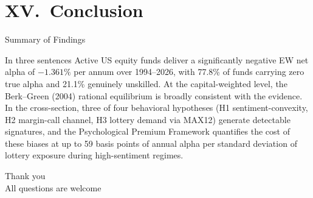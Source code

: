 \documentclass[10pt, aspectratio=169]{beamer}
\newcommand{\pct}{\%}
\begin{document}
\section{XV.\ Conclusion}

\begin{frame}{Summary of Findings}
  \begin{block}{In three sentences}
    Active US equity funds deliver a significantly negative EW net alpha of
    $-1.361\pct$ per annum over 1994–2026, with 77.8\% of funds carrying zero true alpha
    and 21.1\% genuinely unskilled. At the capital-weighted level, the Berk–Green (2004)
    rational equilibrium is broadly consistent with the evidence. In the cross-section,
    three of four behavioral hypotheses (H1 sentiment-convexity, H2 margin-call channel,
    H3 lottery demand via MAX12) generate detectable signatures, and the Psychological
    Premium Framework quantifies the cost of these biases at up to 59 basis points of
    annual alpha per standard deviation of lottery exposure during high-sentiment regimes.
  \end{block}
\end{frame}

\begin{frame}[standout]
  \Huge Thank you\\[12pt]
  \normalsize
  All questions are welcome
\end{frame}


\appendix
\end{document}
